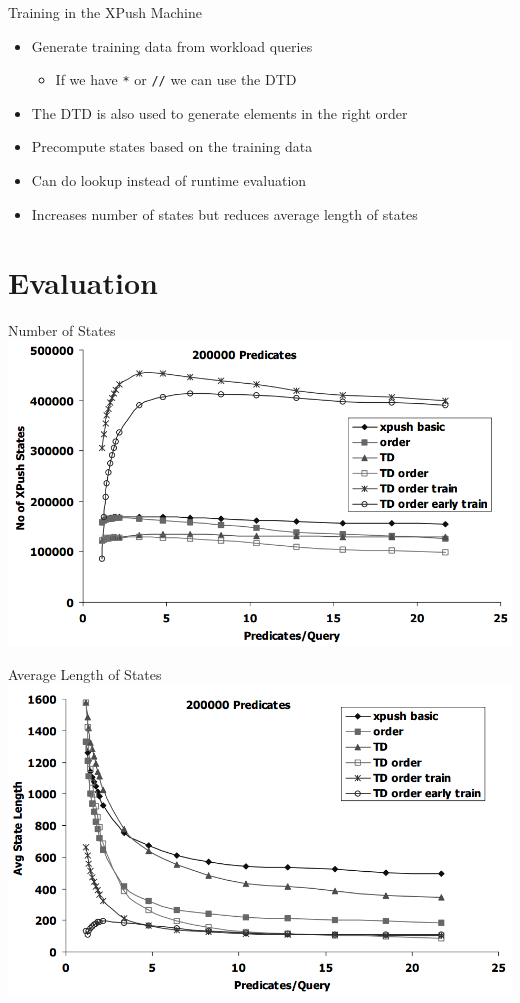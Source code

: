 \documentclass[mathserif,serif]{beamer}
\begin{document}
  \begin{frame}{Training in the XPush Machine}
    \begin{itemize}
      \item Generate training data from workload queries
        \begin{itemize}
          \item If we have \texttt{*} or \texttt{//} we can use the DTD
        \end{itemize}
      \item The DTD is also used to generate elements in the right order
      \item Precompute states based on the training data
      \item Can do lookup instead of runtime evaluation 
      \item Increases number of states but reduces average length of states
    \end{itemize}
  \end{frame}

  \section{Evaluation}
  \begin{frame}{Number of States}
    \includegraphics[width=\textwidth]{states}
  \end{frame}

  \begin{frame}{Average Length of States}
    \includegraphics[width=\textwidth]{avglen}
  \end{frame}
\end{document}
